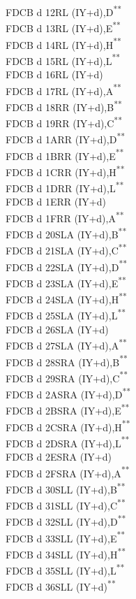 \documentclass[12pt,twoside,openright,a4paper]{book}
\newcommand{\UNDOC}{\textnormal{\textsuperscript{**}}}
\begin{document}
\begin{multicols}{3}
{\begin{tabbing}
	FDCB d 12\>RL (IY+d),D\UNDOC\\
	FDCB d 13\>RL (IY+d),E\UNDOC\\
	FDCB d 14\>RL (IY+d),H\UNDOC\\
	FDCB d 15\>RL (IY+d),L\UNDOC\\
	FDCB d 16\>RL (IY+d)\\
	FDCB d 17\>RL (IY+d),A\UNDOC\\
	FDCB d 18\>RR (IY+d),B\UNDOC\\
	FDCB d 19\>RR (IY+d),C\UNDOC\\
	FDCB d 1A\>RR (IY+d),D\UNDOC\\
	FDCB d 1B\>RR (IY+d),E\UNDOC\\
	FDCB d 1C\>RR (IY+d),H\UNDOC\\
	FDCB d 1D\>RR (IY+d),L\UNDOC\\
	FDCB d 1E\>RR (IY+d)\\
	FDCB d 1F\>RR (IY+d),A\UNDOC\\
	FDCB d 20\>SLA (IY+d),B\UNDOC\\
	FDCB d 21\>SLA (IY+d),C\UNDOC\\
	FDCB d 22\>SLA (IY+d),D\UNDOC\\
	FDCB d 23\>SLA (IY+d),E\UNDOC\\
	FDCB d 24\>SLA (IY+d),H\UNDOC\\
	FDCB d 25\>SLA (IY+d),L\UNDOC\\
	FDCB d 26\>SLA (IY+d)\\
	FDCB d 27\>SLA (IY+d),A\UNDOC\\
	FDCB d 28\>SRA (IY+d),B\UNDOC\\
	FDCB d 29\>SRA (IY+d),C\UNDOC\\
	FDCB d 2A\>SRA (IY+d),D\UNDOC\\
	FDCB d 2B\>SRA (IY+d),E\UNDOC\\
	FDCB d 2C\>SRA (IY+d),H\UNDOC\\
	FDCB d 2D\>SRA (IY+d),L\UNDOC\\
	FDCB d 2E\>SRA (IY+d)\\
	FDCB d 2F\>SRA (IY+d),A\UNDOC\\
	FDCB d 30\>SLL (IY+d),B\UNDOC\\
	FDCB d 31\>SLL (IY+d),C\UNDOC\\
	FDCB d 32\>SLL (IY+d),D\UNDOC\\
	FDCB d 33\>SLL (IY+d),E\UNDOC\\
	FDCB d 34\>SLL (IY+d),H\UNDOC\\
	FDCB d 35\>SLL (IY+d),L\UNDOC\\
	FDCB d 36\>SLL (IY+d)\UNDOC\\

\end{tabbing}}
\end{multicols}
\end{document}
